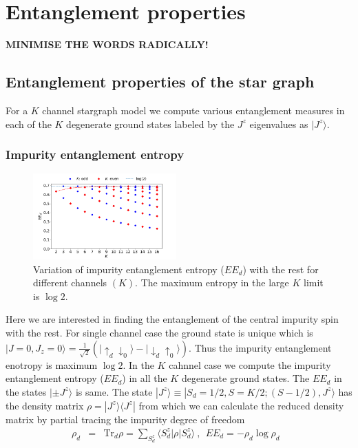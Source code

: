 \documentclass[reprint,prb,superscriptaddress]{revtex4-2}
\begin{document}
\section{Entanglement properties}
\label{sec:ent_prop}
\textbf{MINIMISE THE WORDS RADICALLY!}
\subsection{Entanglement properties of the star graph}
\label{sec:EE_Stargraph}

\noindent For a $K$ channel stargraph model we compute various entanglement measures in each of the $K$ degenerate ground states labeled by the $J^z$ eigenvalues as $|J^z\rangle$.
\subsubsection{Impurity entanglement entropy}
\begin{figure}[!htpb]
\centering
\includegraphics[width=0.49\textwidth]{plt/EE_multi_channel_ANN.png}
\caption{Variation of impurity entanglement entropy ($EE_d$) with the rest for different channels $(K)$. The maximum entropy in the large $K$ limit is $\log 2$.}
\label{fig:EE_d}
\end{figure}
\noindent Here we are interested in finding the entanglement of the central impurity spin with the rest. For single channel case the ground state is unique which is $|J=0,J_z=0 \rangle = \frac{1}{\sqrt{2}} (|\uparrow_{d}\downarrow_0\rangle -|\downarrow_d \uparrow_0\rangle)$. Thus the impurity entanglement enotropy is maximum $\log 2$. In the $K$ cahnnel case we compute the impurity entanglement entropy ($EE_d$) in all the $K$ degenerate ground states. The $EE_d$ in the states $|\pm J^z\rangle$ is same. The state $|J^z\rangle \equiv |S_d=1/2,S=K/2;(S-1/2),J^z\rangle$ has the density matrix $\rho=|J^z\rangle\langle J^z|$ from which we can calculate the reduced density matrix by partial tracing the impurity degree of freedom 
\begin{eqnarray}
\rho_{d}&=& \textrm{Tr}_{d} \rho=\sum_{S_d^z} \langle S_d^z| \rho | S^z_d\rangle ~,~~EE_d = -\rho_{d} \log \rho_{d}~~~
\end{eqnarray}
\end{document}
